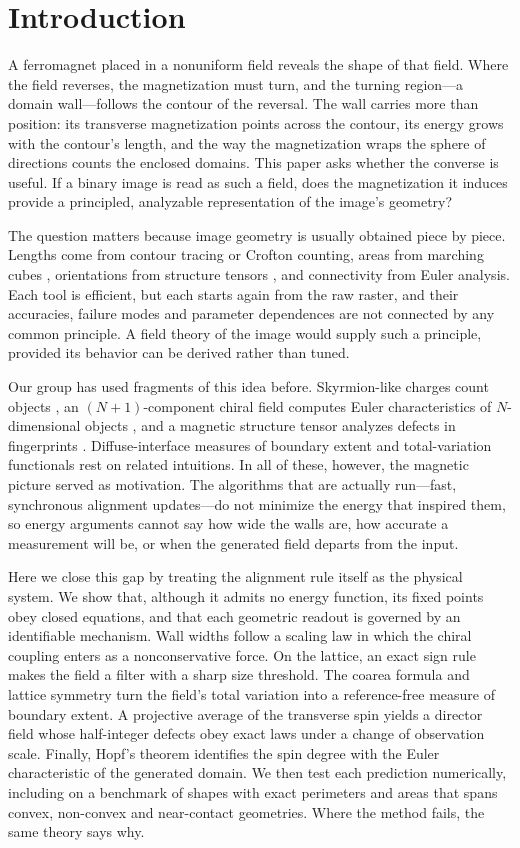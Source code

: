 \documentclass[11pt,a4paper]{article}
\begin{document}
\section*{Introduction}
A ferromagnet placed in a nonuniform field reveals the shape of that field. Where the field reverses, the magnetization must turn, and the turning region---a domain wall---follows the contour of the reversal. The wall carries more than position: its transverse magnetization points across the contour, its energy grows with the contour's length, and the way the magnetization wraps the sphere of directions counts the enclosed domains. This paper asks whether the converse is useful. If a binary image is read as such a field, does the magnetization it induces provide a principled, analyzable representation of the image's geometry?

The question matters because image geometry is usually obtained piece by piece. Lengths come from contour tracing or Crofton counting, areas from marching cubes \cite{Lorensen1987}, orientations from structure tensors \cite{Bigun1991}, and connectivity from Euler analysis. Each tool is efficient, but each starts again from the raw raster, and their accuracies, failure modes and parameter dependences are not connected by any common principle. A field theory of the image would supply such a principle, provided its behavior can be derived rather than tuned.

Our group has used fragments of this idea before. Skyrmion-like charges count objects \cite{Park2024AMT}, an $(N+1)$-component chiral field computes Euler characteristics of $N$-dimensional objects \cite{Moon2025SR}, and a magnetic structure tensor analyzes defects in fingerprints \cite{Park2025iScience}. Diffuse-interface measures of boundary extent \cite{Modica1987,Allen1979,Chan2001} and total-variation functionals \cite{Rudin1992} rest on related intuitions. In all of these, however, the magnetic picture served as motivation. The algorithms that are actually run---fast, synchronous alignment updates---do not minimize the energy that inspired them, so energy arguments cannot say how wide the walls are, how accurate a measurement will be, or when the generated field departs from the input.

Here we close this gap by treating the alignment rule itself as the physical system. We show that, although it admits no energy function, its fixed points obey closed equations, and that each geometric readout is governed by an identifiable mechanism. Wall widths follow a scaling law in which the chiral coupling enters as a nonconservative force. On the lattice, an exact sign rule makes the field a filter with a sharp size threshold. The coarea formula and lattice symmetry turn the field's total variation into a reference-free measure of boundary extent. A projective average of the transverse spin yields a director field whose half-integer defects obey exact laws under a change of observation scale. Finally, Hopf's theorem identifies the spin degree with the Euler characteristic of the generated domain. We then test each prediction numerically, including on a benchmark of shapes with exact perimeters and areas that spans convex, non-convex and near-contact geometries. Where the method fails, the same theory says why.
\end{document}

